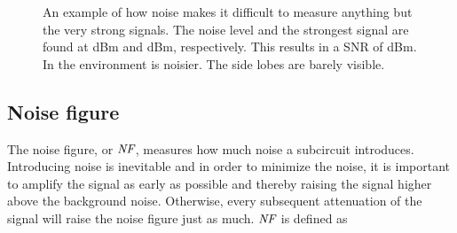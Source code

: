 			\begin{figure}[hb!!!]
				\centering
				\caption[Example of signal plus noise.]{ An example of how noise makes it difficult to measure anything but the very strong signals. The noise level and the strongest signal are found at \unit[20]{dBm} and \unit[87]{dBm}, respectively. This results in a SNR of \unit[67]{dBm}. In  the environment is noisier. The side lobes are barely visible.}\label{fig:noise_example}
			\end{figure}

		\subsection{Noise figure}
			The noise figure, or $\emph{NF}$, measures how much noise a subcircuit introduces. Introducing noise is inevitable and in order to minimize the noise, it is important to amplify the signal as early as possible and thereby raising the signal higher above the background noise. Otherwise, every subsequent attenuation of the signal will raise the noise figure just as much. $\emph{NF}$ is defined as

